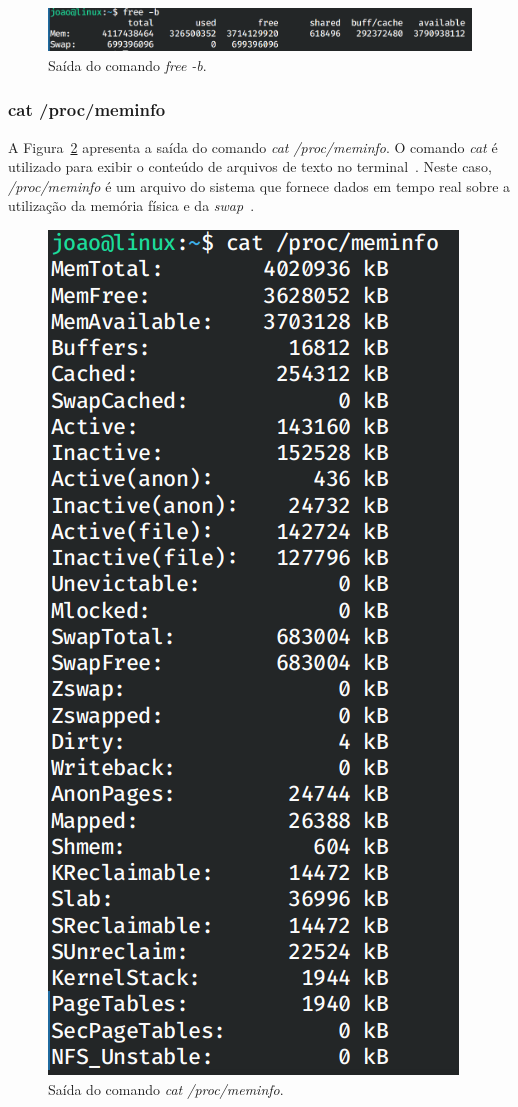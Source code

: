 \documentclass[
	12pt,				%
	oneside,   	        %
	a4paper,			%
	english,			%
	french,				%
	spanish,			%
	brazil,				%
	]{pacotes/abntex2}
\begin{document}
\begin{figure}[H]
  \centering
  \includegraphics[scale=0.5]{figuras/free.png}
  \caption{Saída do comando \textit{free -b}.}
  \label{fig:free}
\end{figure}

\subsubsection{cat /proc/meminfo}
A Figura~\ref{fig:meminfo} apresenta a saída do comando \textit{cat /proc/meminfo}. O comando \textit{cat} é utilizado para exibir o conteúdo de arquivos de texto no terminal~\cite{manCat}. Neste caso, \textit{/proc/meminfo} é um arquivo do sistema que fornece dados em tempo real sobre a utilização da memória física e da \textit{swap}~\cite{tldpProc}.

\begin{figure}[H]
  \centering
  \includegraphics[scale=0.5]{figuras/proc.png}
  \caption{Saída do comando \textit{cat /proc/meminfo}.}
  \label{fig:meminfo}
\end{figure}
\end{document}
